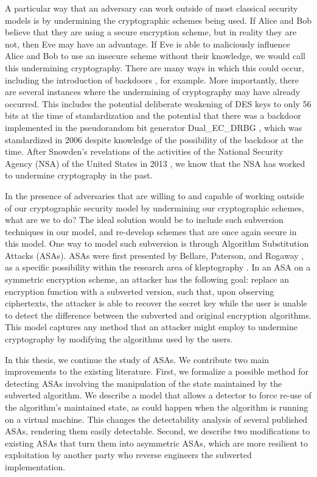 A particular way that an adversary can work outside of most classical security models is by undermining the cryptographic schemes being used. If Alice and Bob believe that they are using a secure encryption scheme, but in reality they are not, then Eve may have an advantage. If Eve is able to maliciously influence Alice and Bob to use an insecure scheme without their knowledge, we would call this undermining cryptography. There are many ways in which this could occur, including the introduction of backdoors \cite{FSE:RijPre97,FSE:Paterson99}, for example. More importantly, there are several instances where the undermining of cryptography may have already occurred. This includes the potential deliberate weakening of DES keys to only 56 bits at the time of standardization \cite{SB1988} and the potential that there was a backdoor implemented in the pseudorandom bit generator Dual\_EC\_DRBG \cite{USENIX:CNEGLRBMSF14}, which was standardized in 2006 despite knowledge of the possibility of the backdoor at the time. After Snowden's revelations of the activities of the National Security Agency (NSA) of the United States in 2013 \cite{snowden}, we know that the NSA has worked to undermine cryptography in the past.

In the presence of adversaries that are willing to and capable of working outside of our cryptographic security model by undermining our cryptographic schemes, what are we to do? The ideal solution would be to include such subversion techniques in our model, and re-develop schemes that are once again secure in this model. One way to model such subversion is through Algorithm Substitution Attacks (ASAs). ASAs were first presented by Bellare, Paterson, and Rogaway \cite{C:BelPatRog14}, as a specific possibility within the research area of kleptography \cite{C:YouYun96,EC:YouYun97,FSE:YouYun98,SAC:YouYun04,ACISP:YouYun03}. In an ASA on a symmetric encryption scheme, an attacker has the following goal: replace an encryption function with a subverted version, such that, upon observing ciphertexts, the attacker is able to recover the secret key while the user is unable to detect the difference between the subverted and original encryption algorithms. This model captures any method that an attacker might employ to undermine cryptography by modifying the algorithms used by the users.

In this thesis, we continue the study of ASAs. We contribute two main improvements to the existing literature. First, we formalize a possible method for detecting ASAs involving the manipulation of the state maintained by the subverted algorithm. We describe a model that allows a detector to force re-use of the algorithm's maintained state, as could happen when the algorithm is running on a virtual machine. This changes the detectability analysis of several published ASAs, rendering them easily detectable. Second, we describe two modifications to existing ASAs that turn them into asymmetric ASAs, which are more resilient to exploitation by another party who reverse engineers the subverted implementation.

